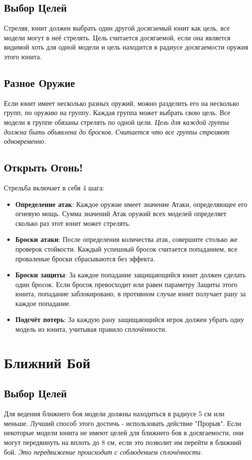 \documentclass[twocolumn]{article}
\newcommand{\h}[1]{\textbf{#1}}
\begin{document}
\subsection{Выбор Целей}
Стреляя, юнит должен выбрать один другой досягаемый юнит как цель, все модели могут в неё стрелять.
Цель считается досягаемой, если она является видимой хоть для одной модели и цель находится в радиусе досягаемости оружия этого юнита.
\subsection{Разное Оружие}
Если юнит имеет несколько разных оружий, можно разделить его на несколько групп, по оружию на группу. Каждая группа может выбрать свою цель. Все модели в группе обязаны стрелять по одной цели. \emph{Цель для каждой группы должна быть объявлена до бросков. Считается что все группы стреляют одновременно.}

\subsection{Открыть Огонь!}
Стрельба включает в себя 4 шага:
\begin{itemize}
    \item \h{Определение атак}: Каждое оружие имеет значение Атаки, определяющее его огневую мощь. Сумма значений Атак оружий всех моделей определяет сколько раз этот юнит может стрелять.
    \item \h{Броски атаки}: После определения количества атак, совершите столько же проверок стойкости. Каждый успешный бросок считается попаданием, все проваленые броски сбрасываются без эффекта.
    \item \h{Броски защиты}: За каждое попадание защищающийся юнит должен сделать один бросок. Если бросок превосходит или равен параметру Защиты этого юнита, попадание заблокировано, в противном случае юнит получает рану за каждое попадание.
    \item \h{Подсчёт потерь}: За каждую рану защищающийся игрок должен убрать одну модель из юнита, учитывая правило сплочённости.
\end{itemize}

\newpage

\section{Ближний Бой}
\subsection{Выбор Целей}
Для ведения ближнего боя модели должны находиться в радиусе 5 см или меньше. Лучший способ этого достичь - использовать действие "Прорыв". Если некоторые модели юнита не имеют целей для ближнего боя в досягаемости, они могут передвинуть на вплоть до 8 см, если это позволит им перейти в ближний бой. \emph{Это передвижение происходит с соблюдением сплочённости.}
\end{document}
